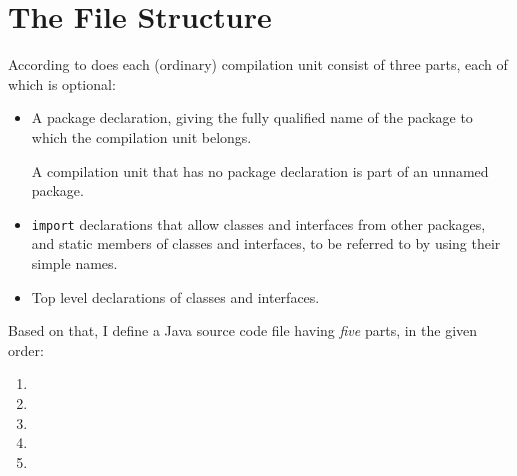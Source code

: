 \section{The File Structure}\label{sec:FileStructure}

According to \jls \autocite{ORACLE_DOC_LANGUAGE_SPECIFICATION:CompilationUnit} does each (ordinary) compilation unit consist of three parts, each of which is optional:

\begin{itemize}
	\item{A package declaration, giving the fully qualified name of the package to which the compilation unit belongs.

A compilation unit that has no package declaration is part of an unnamed package.}
	\item{\lstinline|import| declarations that allow classes and interfaces from other packages, and static members of classes and interfaces, to be referred to by using their simple names.}
	\item{Top level declarations of classes and interfaces.}
\end{itemize}

Based on that, I define a Java source code file having \textit{five} parts, in the given order:
\begin{enumerate}[nosep]
\item{}
\item{}
\item{}
\item{}
\item{}
\end{enumerate}








